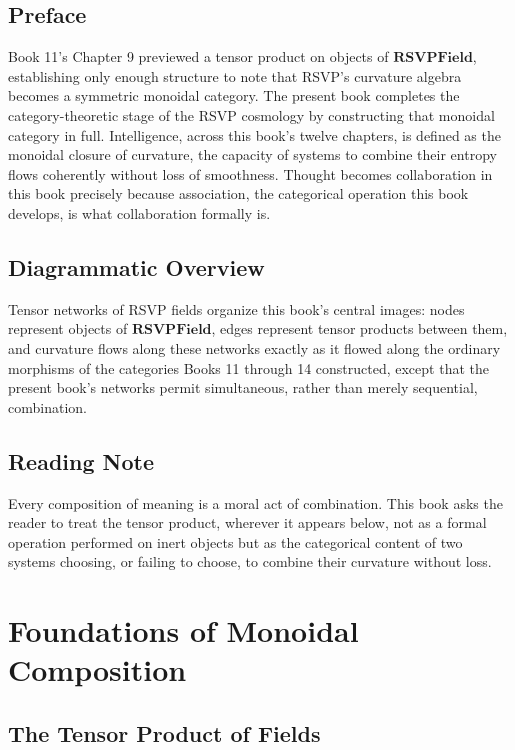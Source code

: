 \chapter*{Preface}

Book 11's Chapter 9 previewed a tensor product on objects of $\mathbf{RSVPField}$, establishing only enough structure to note that RSVP's curvature algebra becomes a symmetric monoidal category. The present book completes the category-theoretic stage of the RSVP cosmology by constructing that monoidal category in full. Intelligence, across this book's twelve chapters, is defined as the monoidal closure of curvature, the capacity of systems to combine their entropy flows coherently without loss of smoothness. Thought becomes collaboration in this book precisely because association, the categorical operation this book develops, is what collaboration formally is.

\chapter*{Diagrammatic Overview}

Tensor networks of RSVP fields organize this book's central images: nodes represent objects of $\mathbf{RSVPField}$, edges represent tensor products between them, and curvature flows along these networks exactly as it flowed along the ordinary morphisms of the categories Books 11 through 14 constructed, except that the present book's networks permit simultaneous, rather than merely sequential, combination.

\chapter*{Reading Note}

Every composition of meaning is a moral act of combination. This book asks the reader to treat the tensor product, wherever it appears below, not as a formal operation performed on inert objects but as the categorical content of two systems choosing, or failing to choose, to combine their curvature without loss.

\part{Foundations of Monoidal Composition}

\chapter{The Tensor Product of Fields}

